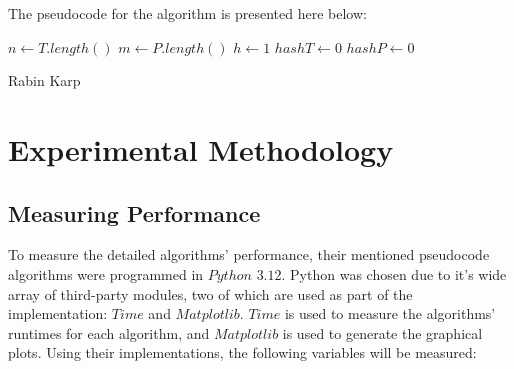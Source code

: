 \documentclass[12pt]{article}
\begin{document}
The pseudocode for the algorithm is presented here below:

\begin{center}
\begin{singlespace}
\begin{minipage}{0.75\linewidth}
\begin{algorithm}[H]
	$n \leftarrow T.length()$ \;
	$m \leftarrow P.length()$ \;
	$h \leftarrow 1$ \;
	$hashT \leftarrow 0$ \;
	$hashP \leftarrow 0$ \;

	\bigskip


	\bigskip


	\bigskip

\caption{Rabin Karp}
\end{algorithm}
\end{minipage}
\end{singlespace}
\end{center}

\section{Experimental Methodology}

\subsection{Measuring Performance}

To measure the detailed algorithms' performance, their mentioned pseudocode algorithms were programmed in $Python$ $3.12$. 
Python was chosen due to it's wide array of third-party modules, two of which are used as part of the implementation: $Time$ and $Matplotlib$. 
$Time$ is used to measure the algorithms' runtimes for each algorithm, and $Matplotlib$ is used to generate the graphical plots.
Using their implementations, the following variables will be measured:
\end{document}

